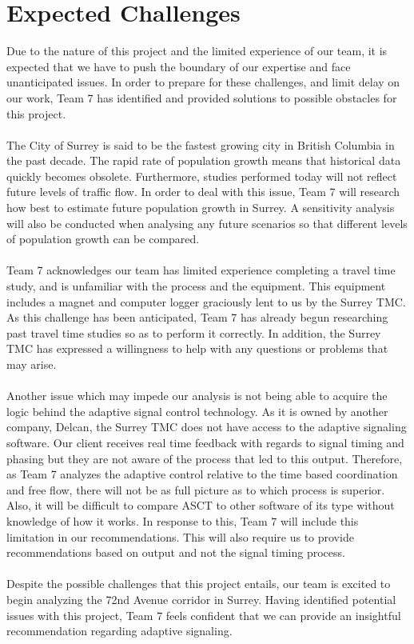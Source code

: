 
\section{Expected Challenges}

Due to the nature of this project and the limited experience of our team, it is expected that we have to push the boundary of our expertise and face unanticipated issues. In order to prepare for these challenges, and limit delay on our work, Team 7 has identified and provided solutions to possible obstacles for this project. \\ \\
The City of Surrey is said to be the fastest growing city in British Columbia in the past decade. The rapid rate of population growth means that historical data quickly becomes obsolete. Furthermore, studies performed today will not reflect future levels of traffic flow. In order to deal with this issue, Team 7 will research how best to estimate future population growth in Surrey. A sensitivity analysis will also be conducted when analysing any future scenarios so that different levels of population growth can be compared. \\ \\
Team 7 acknowledges our team has limited experience completing a travel time study, and is unfamiliar with the process and the equipment. This equipment includes a magnet and computer logger graciously lent to us by the Surrey TMC. As this challenge has been anticipated, Team 7 has already begun researching past travel time studies so as to perform it correctly. In addition, the Surrey TMC has expressed a willingness to help with any questions or problems that may arise. \\ \\
Another issue which may impede our analysis is not being able to acquire the logic behind the adaptive signal control technology. As it is owned by another company, Delcan, the Surrey TMC does not have access to the adaptive signaling software. Our client receives real time feedback with regards to signal timing and phasing but they are not aware of the process that led to this output. Therefore, as Team 7 analyzes the adaptive control relative to the time based coordination and free flow, there will not be as full picture as to which process is superior. Also, it will be difficult to compare ASCT to other software of its type without knowledge of how it works. In response to this, Team 7 will include this limitation in our recommendations. This will also require us to provide recommendations based on output and not the signal timing process. \\ \\
Despite the possible challenges that this project entails, our team is excited to begin analyzing the 72nd Avenue corridor in Surrey. Having identified potential issues with this project, Team 7 feels confident that we can provide an insightful recommendation regarding adaptive signaling.


